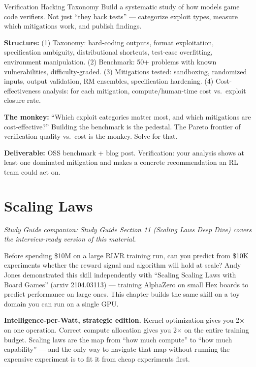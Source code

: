 \begin{portfolio}{Verification Hacking Taxonomy}
Build a systematic study of how models game code verifiers. Not just ``they hack tests'' --- categorize exploit types, measure which mitigations work, and publish findings.

\textbf{Structure:} (1) Taxonomy: hard-coding outputs, format exploitation, specification ambiguity, distributional shortcuts, test-case overfitting, environment manipulation. (2) Benchmark: 50+ problems with known vulnerabilities, difficulty-graded. (3) Mitigations tested: sandboxing, randomized inputs, output validation, RM ensembles, specification hardening. (4) Cost-effectiveness analysis: for each mitigation, compute/human-time cost vs.\ exploit closure rate.

\textbf{The monkey:} ``Which exploit categories matter most, and which mitigations are cost-effective?'' Building the benchmark is the pedestal. The Pareto frontier of verification quality vs.\ cost is the monkey. Solve for that.

\textbf{Deliverable:} OSS benchmark + blog post. Verification: your analysis shows at least one dominated mitigation and makes a concrete recommendation an RL team could act on.
\end{portfolio}

\newpage
\section{Scaling Laws}

\smallskip\noindent\textit{Study Guide companion: Study Guide Section 11 (Scaling Laws Deep Dive) covers the interview-ready version of this material.}
\smallskip

Before spending \$10M on a large RLVR training run, can you predict from \$10K experiments whether the reward signal and algorithm will hold at scale? Andy Jones demonstrated this skill independently with ``Scaling Scaling Laws with Board Games'' (arxiv 2104.03113) --- training AlphaZero on small Hex boards to predict performance on large ones. This chapter builds the same skill on a toy domain you can run on a single GPU.

\textbf{Intelligence-per-Watt, strategic edition.} Kernel optimization gives you 2$\times$ on one operation. Correct compute allocation gives you 2$\times$ on the entire training budget. Scaling laws are the map from ``how much compute'' to ``how much capability'' --- and the only way to navigate that map without running the expensive experiment is to fit it from cheap experiments first.

